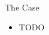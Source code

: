 \documentclass[aspectratio=43,handout,bigger]{beamer}
\begin{document}
\begin{frame}{The Case}
  \begin{itemize}
    \item TODO
  \end{itemize}
%
%
%
%
%
%
%
%
%

\end{frame}
\end{document}
